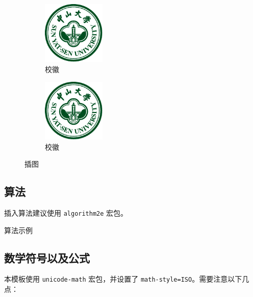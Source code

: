 \begin{figure}[H]
    \centering
    \begin{subfigure}{3cm}
        \centering
        \includegraphics[width=3cm]{figures/sysu-badge.pdf}
        \caption{校徽}
    \end{subfigure}
    \hspace{3cm}
    \begin{subfigure}{3cm}
        \centering
        \includegraphics[width=3cm]{figures/sysu-badge.pdf}
        \caption{校徽}
    \end{subfigure}
    \caption{插图}
    \label{fig-example}
\end{figure}

\subsection{算法}

插入算法建议使用 \verb|algorithm2e| 宏包。
\vspace{.5\baselineskip}

\begin{algorithm}[H]
    \caption{算法示例}
    \label{algo:algorithm1}
\end{algorithm}

\subsection{数学符号以及公式}

本模板使用 \verb|unicode-math| 宏包，并设置了 \verb|math-style=ISO|。需要注意以下几点：

